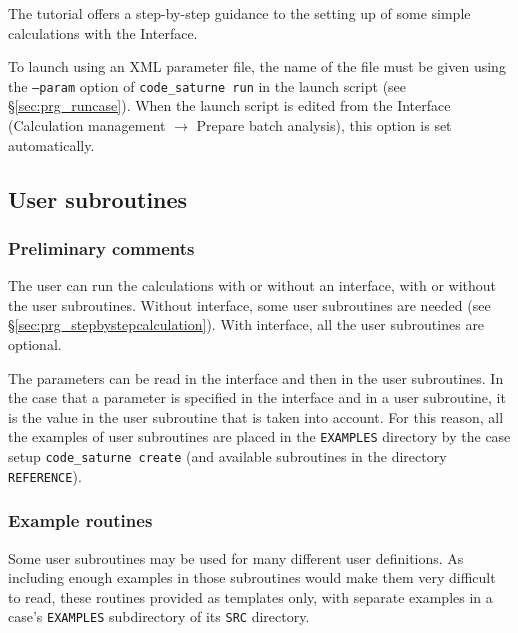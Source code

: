 {{{{\begin{list}{-}{}
\end{list}

The \CS tutorial \cite{tutorial} offers a step-by-step guidance to the setting
up of some simple calculations with the \CS Interface.

To launch \CS using an XML parameter file,
the name of the file must
be given using the \texttt{--param} option of \texttt{code\_saturne run} in
the launch script (see \S\ref{sec:prg_runcase}). When the launch
script is edited from the Interface (Calculation management $\rightarrow$
Prepare batch analysis), this option is set automatically.

\subsection{User subroutines}
\label{sec:prg_ssprgutilis}
\subsubsection{Preliminary comments}

The user can run the calculations with or without an interface, with or
 without the user subroutines. Without interface, some user subroutines
 are needed (see \S\ref{sec:prg_stepbystepcalculation}). With interface,
all the user subroutines are optional.

The parameters can be read in the interface and then in the user
subroutines. In the case that a parameter is specified in the interface
 and in a user subroutine, it is the value in the user subroutine that
 is taken into account. For this reason, all the examples of
 user subroutines are placed in the \texttt{EXAMPLES} directory by the
 case setup \texttt{code\_saturne~create} (and available subroutines in the
 directory \texttt{REFERENCE}).

\subsubsection{Example routines}

Some user subroutines may be used for many different user definitions. As
including enough examples in those subroutines would make them very
difficult to read, these routines provided as templates only, with
separate examples in a case's \texttt{EXAMPLES} subdirectory of its
\texttt{SRC} directory.

}}}}
